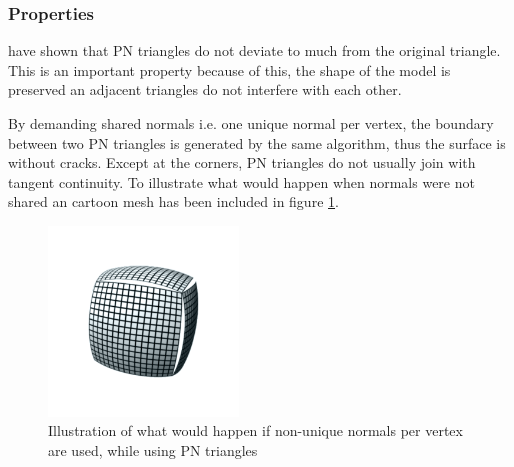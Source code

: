\subsubsection{Properties}
\label{sss:method:geometric:properties}
\citeauthor{vlachos2001curved} have shown that PN triangles do not deviate to much from the original triangle. This is an important property because of this, the shape of the model is preserved an adjacent triangles do not interfere with each other. 

By demanding shared normals i.e. one unique normal per vertex, the boundary between two PN triangles is generated by the same algorithm, thus the surface is without cracks. Except at the corners, PN triangles do not usually join with tangent continuity. To illustrate what would happen when normals were not shared an cartoon mesh has been included in figure \ref{fig:method:cracks}.

\begin{figure}
	\centering
	\includegraphics[width=0.45\textwidth]{./content/img/method/cracks.png}
	\caption{Illustration of what would happen if non-unique normals per vertex are used, while using PN triangles }
	\label{fig:method:cracks}
\end{figure}

